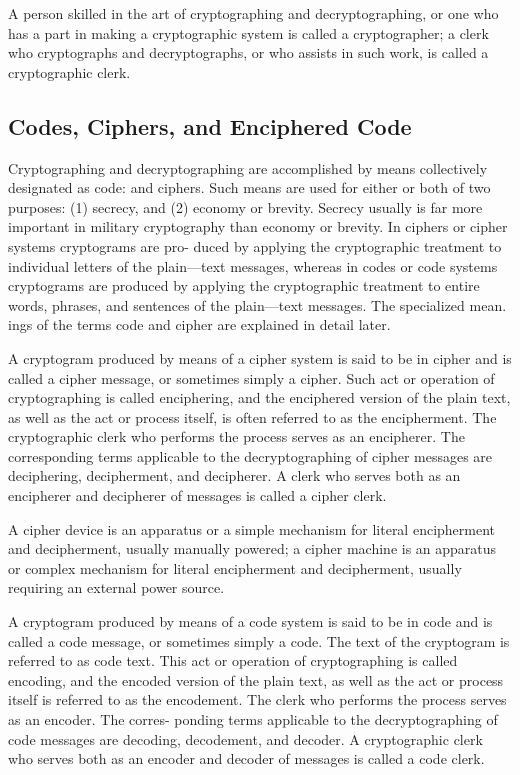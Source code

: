 \mypara A person skilled in the art of cryptographing and decryptographing,
or one who has a part in making a cryptographic system is called a
cryptographer; a clerk who cryptographs and decryptographs, or who
assists in such work, is called a cryptographic clerk.

\subsection{Codes, Ciphers, and Enciphered Code}

\mypara Cryptographing and decryptographing are accomplished by means
collectively designated as code: and ciphers. Such means are used for
either or both of two purposes: (1) secrecy, and (2) economy or brevity.
Secrecy usually is far more important in military cryptography than
economy or brevity. In ciphers or cipher systems cryptograms are pro-
duced by applying the cryptographic treatment to individual letters of
the plain—text messages, whereas in codes or code systems cryptograms
are produced by applying the cryptographic treatment to entire words,
phrases, and sentences of the plain—text messages. The specialized mean.
ings of the terms code and cipher are explained in detail later.

\mypara A cryptogram produced by means of a cipher system is said to be
in cipher and is called a cipher message, or sometimes simply a cipher.
Such act or operation of cryptographing is called enciphering, and the
enciphered version of the plain text, as well as the act or process itself,
is often referred to as the encipherment. The cryptographic clerk who
performs the process serves as an encipherer. The corresponding terms
applicable to the decryptographing of cipher messages are deciphering,
decipherment, and decipherer. A clerk who serves both as an encipherer
and decipherer of messages is called a cipher clerk.

\mypara A cipher device is an apparatus or a simple mechanism for literal
encipherment and decipherment, usually manually powered; a cipher
machine is an apparatus or complex mechanism for literal encipherment
and decipherment, usually requiring an external power source.

\mypara A cryptogram produced by means of a code system is said to be
in code and is called a code message, or sometimes simply a code. The
text of the cryptogram is referred to as code text. This act or operation
of cryptographing is called encoding, and the encoded version of the plain
text, as well as the act or process itself is referred to as the encodement.
The clerk who performs the process serves as an encoder. The corres-
ponding terms applicable to the decryptographing of code messages are
decoding, decodement, and decoder. A cryptographic clerk who serves
both as an encoder and decoder of messages is called a code clerk.

